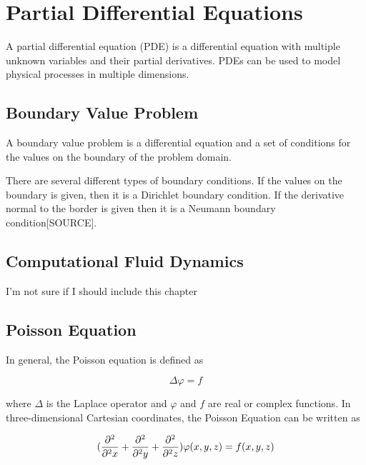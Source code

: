 \section*{Partial Differential Equations}

A partial differential equation (PDE) is a differential equation with multiple 
unknown variables and their partial derivatives. PDEs can be used to model physical 
processes in multiple dimensions. 

\subsection*{Boundary Value Problem}

A boundary value problem is a differential equation and a set of conditions for the values on the boundary of the problem domain. 

There are several different types of boundary conditions. If the values on the boundary is given, then it is a Dirichlet boundary condition. If the derivative normal to the border is given then it is a Neumann boundary condition[SOURCE].

\subsection*{Computational Fluid Dynamics}

I'm not sure if I should include this chapter

\subsection*{Poisson Equation}

In general, the Poisson equation is defined as 

$$\Delta \varphi = f$$

where $\Delta$ is the Laplace operator and $\varphi$ and $f$ are real or complex 
functions. In three-dimensional Cartesian coordinates, the Poisson Equation can 
be written as 

$$(\frac{\partial^2}{\partial^2 x} + \frac{\partial^2}{\partial^2 y} + \frac{\partial^2}{\partial^2 z}) \varphi (x, y, z) = f(x, y, z)$$

